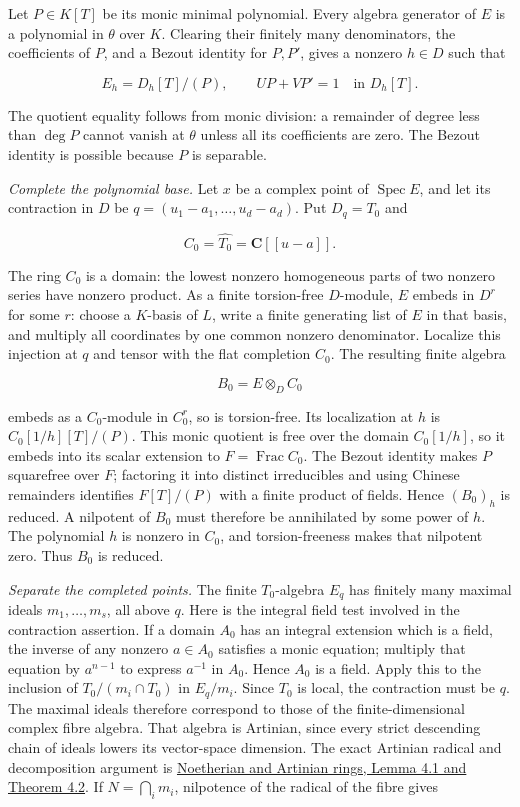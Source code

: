 \documentclass[11pt]{article}
\begin{document}
Let \(P\in K[T]\) be its monic minimal polynomial. Every algebra
generator of \(E\) is a polynomial in \(\theta\) over \(K\). Clearing
their finitely many denominators, the coefficients of \(P\), and a
Bezout identity for \(P,P'\), gives a nonzero \(h\in D\) such that

\[
E_h=D_h[T]/(P),\qquad
U P+V P'=1\quad\text{in }D_h[T].
\]

The quotient equality follows from monic division: a remainder of degree
less than \(\deg P\) cannot vanish at \(\theta\) unless all its
coefficients are zero. The Bezout identity is possible because \(P\) is
separable.

\emph{Complete the polynomial base.} Let \(x\) be a complex point of
\(\operatorname{Spec}E\), and let its contraction in \(D\) be
\(q=(u_1-a_1,\ldots,u_d-a_d)\). Put \(D_q=T_0\) and

\[
C_0=\widehat{T_0}=\mathbf C[[u-a]].
\]

The ring \(C_0\) is a domain: the lowest nonzero homogeneous parts of
two nonzero series have nonzero product. As a finite torsion-free
\(D\)-module, \(E\) embeds in \(D^r\) for some \(r\): choose a
\(K\)-basis of \(L\), write a finite generating list of \(E\) in that
basis, and multiply all coordinates by one common nonzero denominator.
Localize this injection at \(q\) and tensor with the flat completion
\(C_0\). The resulting finite algebra

\[
B_0=E\otimes_D C_0
\]

embeds as a \(C_0\)-module in \(C_0^r\), so is torsion-free. Its
localization at \(h\) is \(C_0[1/h][T]/(P)\). This monic quotient is
free over the domain \(C_0[1/h]\), so it embeds into its scalar
extension to \(F=\operatorname{Frac}C_0\). The Bezout identity makes
\(P\) squarefree over \(F\); factoring it into distinct irreducibles and
using Chinese remainders identifies \(F[T]/(P)\) with a finite product
of fields. Hence \((B_0)_h\) is reduced. A nilpotent of \(B_0\) must
therefore be annihilated by some power of \(h\). The polynomial \(h\) is
nonzero in \(C_0\), and torsion-freeness makes that nilpotent zero. Thus
\(B_0\) is reduced.

\emph{Separate the completed points.} The finite \(T_0\)-algebra \(E_q\)
has finitely many maximal ideals \(m_1,\ldots,m_s\), all above \(q\).
Here is the integral field test involved in the contraction assertion.
If a domain \(A_0\) has an integral extension which is a field, the
inverse of any nonzero \(a\in A_0\) satisfies a monic equation; multiply
that equation by \(a^{n-1}\) to express \(a^{-1}\) in \(A_0\). Hence
\(A_0\) is a field. Apply this to the inclusion of \(T_0/(m_i\cap T_0)\)
in \(E_q/m_i\). Since \(T_0\) is local, the contraction must be \(q\).
The maximal ideals therefore correspond to those of the
finite-dimensional complex fibre algebra. That algebra is Artinian,
since every strict descending chain of ideals lowers its vector-space
dimension. The exact Artinian radical and decomposition argument is
\href{../AG-CA/AG-CA-03.html\#4-what-an-artinian-ring-looks-like}{Noetherian
and Artinian rings, Lemma 4.1 and Theorem 4.2}. If \(N=\bigcap_i m_i\),
nilpotence of the radical of the fibre gives
\end{document}
